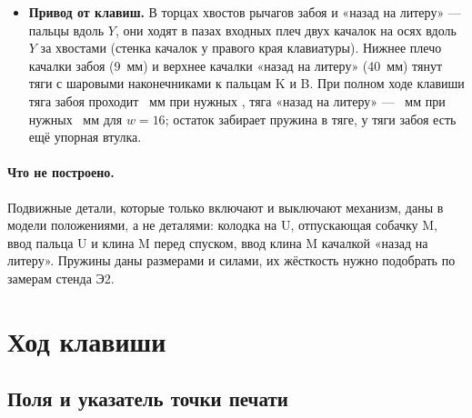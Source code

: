 \begin{itemize}
  \item \textbf{Привод от клавиш.} В торцах хвостов рычагов забоя и «назад на литеру» — пальцы вдоль $Y$, они ходят в пазах входных плеч двух качалок на осях вдоль $Y$ за хвостами (стенка качалок у правого края клавиатуры). Нижнее плечо качалки забоя (9~мм) и верхнее качалки «назад на литеру» (40~мм) тянут тяги с шаровыми наконечниками к пальцам K и B. При полном ходе клавиши тяга забоя проходит \mbksppull~мм при нужных \mbkspneed, тяга «назад на литеру» — \mbackpull~мм при нужных \mbackneed~мм для $w = 16$; остаток забирает пружина в тяге, у тяги забоя есть ещё упорная втулка.
\end{itemize}

\paragraph{Что не построено.} Подвижные детали, которые только включают и выключают механизм, даны в модели положениями, а не деталями: колодка на U, отпускающая собачку M, ввод пальца U и клина M перед спуском, ввод клина M качалкой «назад на литеру». Пружины даны размерами и силами, их жёсткость нужно подобрать по замерам стенда Э2.

\section{Ход клавиши}
\label{sec:budget}

\subsection{Поля и указатель точки печати}
\label{sec:margins}


